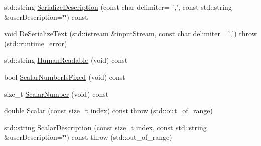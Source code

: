 \begin{DoxyCompactItemize}
\item 
std\-::string \hyperlink{classprm_fixture_gain_cartesian_set_a0765a09735ebf7b562741a331010ae1c}{Serialize\-Description} (const char delimiter= ',', const std\-::string \&user\-Description=\char`\"{}\char`\"{}) const 
\item 
void \hyperlink{classprm_fixture_gain_cartesian_set_a1e6e74e42eb35f5a2722debe34633069}{De\-Serialize\-Text} (std\-::istream \&input\-Stream, const char delimiter= ',')  throw (std\-::runtime\-\_\-error)
\item 
std\-::string \hyperlink{classprm_fixture_gain_cartesian_set_aeac80367a951a1826a94c21f572d22c0}{Human\-Readable} (void) const 
\item 
bool \hyperlink{classprm_fixture_gain_cartesian_set_a27ca490abc1f87d6488450b4d7754d69}{Scalar\-Number\-Is\-Fixed} (void) const 
\item 
size\-\_\-t \hyperlink{classprm_fixture_gain_cartesian_set_aca12f9d304debca6f9db18edd095da5e}{Scalar\-Number} (void) const 
\item 
double \hyperlink{classprm_fixture_gain_cartesian_set_a1683e6337b51638c1cceab06978e6934}{Scalar} (const size\-\_\-t index) const   throw (std\-::out\-\_\-of\-\_\-range)
\item 
std\-::string \hyperlink{classprm_fixture_gain_cartesian_set_a155a4bfe0c7766d366c418f871f1a7d4}{Scalar\-Description} (const size\-\_\-t index, const std\-::string \&user\-Description=\char`\"{}\char`\"{}) const   throw (std\-::out\-\_\-of\-\_\-range)
\end{DoxyCompactItemize}
